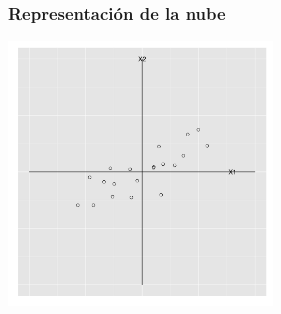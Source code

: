 \documentclass{beamer}
\begin{document}
  \begin{frame}\frametitle{Representación de la nube}
   \begin{overlayarea}{\textwidth}{8cm} 
 \begin{center}
   \includegraphics[height=7cm]{x1x2z1z2rotated00.png}
 \end{center}
   \end{overlayarea}
 \end{frame}
 
\end{document}
